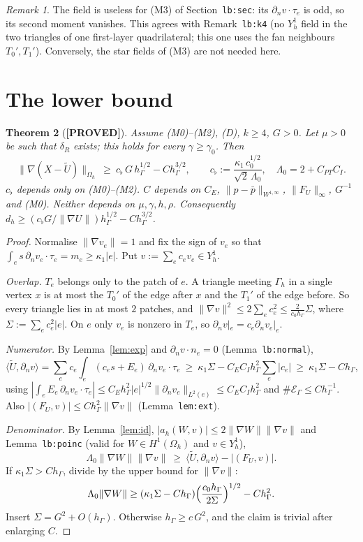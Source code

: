 \documentclass[11pt]{article}
\newtheorem{theorem}{Theorem}
\theoremstyle{remark}
\newtheorem{remark}[theorem]{Remark}
\newcommand{\hG}{h_\Gamma}
\newcommand{\Gh}{\Gamma_h}
\newcommand{\Oh}{\Omega_h}
\newcommand{\norm}[1]{\|#1\|}
\newcommand{\ip}[2]{\langle #1,#2\rangle}
\newcommand{\dn}{\partial_n}
\newcommand{\Ut}{\tilde U}
\newcommand{\pbar}{\bar p}
\newcommand{\lab}[1]{\textbf{[#1]}}
\newcommand{\EG}{\mathcal E_\Gamma}
\begin{document}
\begin{remark}
The field is useless for (M3) of Section~\texttt{lb:sec}: its $\dn v\cdot\tau_e$ is odd, so its second moment vanishes. This agrees with Remark~\texttt{lb:k4} (no $Y_h^1$ field in the two triangles of one first-layer quadrilateral; this one uses the fan neighbours $T_0',T_1'$). Conversely, the star fields of (M3) are not needed here.
\end{remark}

\section{The lower bound}
\begin{theorem}[\lab{PROVED}]\label{thm:main}
Assume (M0)--(M2), (D), $k\ge4$, $G>0$. Let $\mu>0$ be such that $\delta_R$ exists; this holds for every $\gamma\ge\gamma_0$. Then
\[
\norm{\nabla(X-\Ut)}_{\Oh}\ \ge\ c_\flat\,G\,\hG^{1/2}-C\hG^{3/2},\qquad c_\flat:=\frac{\kappa_1\,c_0^{1/2}}{\sqrt2\,\Lambda_0},\quad \Lambda_0=2+C_{PT}C_I .
\]
$c_\flat$ depends only on (M0)--(M2). $C$ depends on $C_E$, $\norm{p-\pbar}_{W^{1,\infty}}$, $\norm{F_U}_\infty$, $G^{-1}$ and (M0). Neither depends on $\mu,\gamma,h,\rho$. Consequently $d_h\ge(c_\flat G/\norm{\nabla U})\hG^{1/2}-C\hG^{3/2}$.
\end{theorem}
\begin{proof}
Normalise $\norm{\nabla v_e}=1$ and fix the sign of $v_e$ so that $\int_es\,\dn v_e\cdot\tau_e=m_e\ge\kappa_1|e|$. Put $v:=\sum_ec_ev_e\in Y_h^1$.

\emph{Overlap.} $T_e$ belongs only to the patch of $e$. A triangle meeting $\Gh$ in a single vertex $x$ is at most the $T_0'$ of the edge after $x$ and the $T_1'$ of the edge before. So every triangle lies in at most $2$ patches, and $\norm{\nabla v}^2\le2\sum_ec_e^2\le\frac{2}{c_0\hG}\Sigma$, where $\Sigma:=\sum_ec_e^2|e|$. On $e$ only $v_e$ is nonzero in $T_e$, so $\dn v|_e=c_e\dn v_e|_e$.

\emph{Numerator.} By Lemma~\ref{lem:exp} and $\dn v\cdot n_e=0$ (Lemma~\texttt{lb:normal}),
\[
\ip{\Ut}{\dn v}=\sum_ec_e\int_e(c_es+E_e)\,\dn v_e\cdot\tau_e\ \ge\ \kappa_1\Sigma-C_EC_I\hG^2\sum_e|c_e|\ \ge\ \kappa_1\Sigma-C\hG ,
\]
using $|\int_eE_e\,\dn v_e\cdot\tau_e|\le C_E\hG^2|e|^{1/2}\norm{\dn v_e}_{L^2(e)}\le C_EC_I\hG^2$ and $\#\EG\le C\hG^{-1}$. Also $|(F_U,v)|\le C\hG^2\norm{\nabla v}$ (Lemma~\texttt{lem:ext}).

\emph{Denominator.} By Lemma~\ref{lem:id}, $|a_h(W,v)|\le2\norm{\nabla W}\norm{\nabla v}$ and Lemma~\texttt{lb:poinc} (valid for $W\in H^1(\Oh)$ and $v\in Y_h^1$),
\[
\Lambda_0\norm{\nabla W}\norm{\nabla v}\ \ge\ \ip{\Ut}{\dn v}-|(F_U,v)| .
\]
If $\kappa_1\Sigma>C\hG$, divide by the upper bound for $\norm{\nabla v}$:
\[
\Lambda_0\norm{\nabla W}\ge(\kappa_1\Sigma-C\hG)\Bigl(\frac{c_0\hG}{2\Sigma}\Bigr)^{1/2}-C\hG^2 .
\]
Insert $\Sigma=G^2+O(\hG)$. Otherwise $\hG\ge c\,G^2$, and the claim is trivial after enlarging $C$.
\end{proof}
\end{document}

